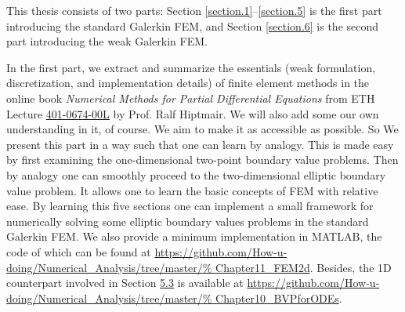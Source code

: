 	
	This thesis consists of two parts: Section \ref{section.1}--\ref{section.5}
	is the first part introducing the standard Galerkin FEM, and Section
	\ref{section.6} is the second part introducing the weak Galerkin FEM.
	
	In the first part, we extract and summarize the essentials 
	(weak formulation, discretization, and implementation details)
	of finite element methods in the online book
	\textit{Numerical Methods for Partial Differential Equations} 
	\cite{Hiptmair} from ETH Lecture
	\href{https://video.ethz.ch/lectures/d-math/2018/spring/401-0674-00L.html}
	{401-0674-00L} by Prof. Ralf Hiptmair. We will also add some our own 
	understanding in it, of course. We aim to make it as accessible as possible.
	So We present this part in a way such that one can learn by analogy. This 
	is made easy by first examining the one-dimensional two-point boundary
	value problems. Then by analogy one can smoothly proceed to the 
	two-dimensional	elliptic boundary value problem. It allows one to learn
	the basic concepts of FEM with relative ease.
	By learning this five sections one can implement a small framework for 
	numerically solving some elliptic boundary values problems in the 
	standard Galerkin FEM. We also provide a minimum implementation in 
	MATLAB, the code of which can be found at 
	\url{https://github.com/How-u-doing/Numerical_Analysis/tree/master/%
		Chapter11_FEM2d}. 
	Besides, the 1D counterpart involved in Section
	\hyperref[subsection.5.3]{5.3} is available at
	\url{https://github.com/How-u-doing/Numerical_Analysis/tree/master/%
		Chapter10_BVPforODEs}.
		
